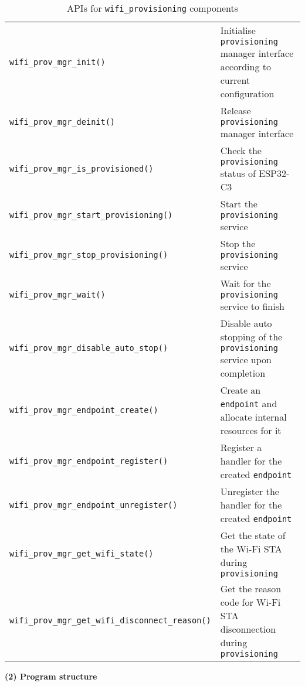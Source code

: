 \documentclass[a4paper,12pt]{book}
\begin{document}
\begin{table}[h!]
    \renewcommand{\arraystretch}{1}
    \caption{APIs for \texttt{wifi\_provisioning} components}
    \begin{tabular}{|>{\footnotesize}m{}|>{\footnotesize}m{}|}
        \hline
        \rowcolor{LightBlue}\multicolumn{1}{|c|}{\textbf{API}}&\multicolumn{1}{c|}{\textbf{Description}}\\
        \hline
        \verb|wifi_prov_mgr_init()|&Initialise \verb|provisioning| manager interface according to current configuration\\
        \hline
        \verb|wifi_prov_mgr_deinit()|&Release \verb|provisioning| manager interface\\
        \hline
        \verb|wifi_prov_mgr_is_provisioned()|&Check the \verb|provisioning| status of ESP32-C3\\
        \hline
        \verb|wifi_prov_mgr_start_provisioning()|&Start the \verb|provisioning| service\\
        \hline
        \verb|wifi_prov_mgr_stop_provisioning()|&Stop the \verb|provisioning| service\\
        \hline
        \verb|wifi_prov_mgr_wait()|&Wait for the \verb|provisioning| service to finish\\
        \hline
        \verb|wifi_prov_mgr_disable_auto_stop()|&Disable auto stopping of the \verb|provisioning| service upon completion\\
        \hline
        \verb|wifi_prov_mgr_endpoint_create()|&Create an \verb|endpoint| and allocate internal resources for it\\
        \hline
        \verb|wifi_prov_mgr_endpoint_register()|&Register a handler for the created \verb|endpoint|\\
        \hline
        \verb|wifi_prov_mgr_endpoint_unregister()|&Unregister the handler for the created \verb|endpoint|\\
        \hline
        \verb|wifi_prov_mgr_get_wifi_state()|&Get the state of the Wi-Fi STA during \verb|provisioning|\\
        \hline
        \verb|wifi_prov_mgr_get_wifi_disconnect_reason()|&Get the reason code for Wi-Fi STA disconnection during \verb|provisioning|\\
        \hline
    \end{tabular}
\end{table}

\textbf{(2) Program structure}
\end{document}

